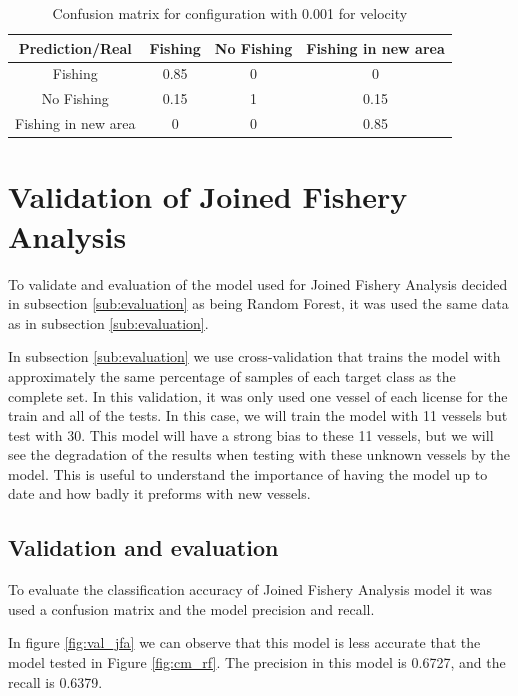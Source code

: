 \begin {table}[H]
\begin{center}
\begin{tabular}{c|c|c|c}
Prediction/Real & \textbf{Fishing} & \textbf{No Fishing} & \textbf{Fishing in new area} \\\hline
Fishing & 0.85 & 0 & 0 \\
No Fishing & 0.15 & 1 & 0.15 \\
Fishing in new area & 0 & 0 & 0.85 
\label{table:val_sfa_cm}
\end{tabular}
\caption {Confusion matrix for configuration with 0.001 for velocity}
\end{center}
\end {table}



\section{Validation of Joined Fishery Analysis} %
\label{sub:val_JFA}

To validate and evaluation of the model used for Joined Fishery Analysis decided in subsection \ref{sub:evaluation} as being Random Forest, it was used the same data as in subsection \ref{sub:evaluation}.

In subsection \ref{sub:evaluation} we use cross-validation \cite{CrossValidatory} that trains the model with approximately the same percentage of samples of each target class as the complete set.
In this validation, it was only used one vessel of each license for the train and all of the tests. In this case, we will train the model with 11 vessels but test with 30. This model will have a strong bias to these 11 vessels, but we will see the degradation of the results when testing with these unknown vessels by the model.
This is useful to understand the importance of having the model up to date and how badly it preforms with new vessels. 





\subsection{Validation and evaluation}
\label{sec:val_JFA_val_eva}
To evaluate the classification accuracy of Joined Fishery Analysis model it was used a confusion matrix and the model precision and recall.

In figure \ref{fig:val_jfa} we can observe that this model is less accurate that the model tested in Figure \ref{fig:cm_rf}. 
The precision in this model is 0.6727, and the recall is 0.6379.

